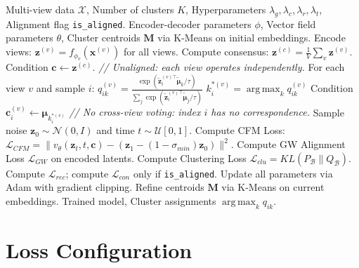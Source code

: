 \documentclass{article}
\DeclareMathOperator*{\argmax}{arg\,max}
\theoremstyle{plain}
\theoremstyle{definition}
\theoremstyle{remark}
\begin{document}
\begin{algorithm}[!htbp]
  \caption{End-to-End Training for OPTION}
  \label{alg:option}
  \begin{algorithmic}
     Multi-view data $\mathcal{X}$, Number of clusters $K$, Hyperparameters $\lambda_g, \lambda_c, \lambda_r, \lambda_t$, Alignment flag \texttt{is\_aligned}.
     Encoder-decoder parameters $\phi$, Vector field parameters $\theta$, Cluster centroids $\mathbf{M}$ via K-Means on initial embeddings.
        \STATE Encode views: $\mathbf{z}^{(v)} = f_{\phi_v}(\mathbf{x}^{(v)})$ for all views.
            \STATE Compute consensus: $\mathbf{z}^{(c)} = \frac{1}{V}\sum_v \mathbf{z}^{(v)}$.
            \STATE Condition $\mathbf{c} \gets \mathbf{z}^{(c)}$.
        \ELSE
            \STATE \textit{// Unaligned: each view operates independently.}
            \STATE For each view $v$ and sample $i$:
            \STATE \quad $q_{ik}^{(v)} = \frac{\exp(\tilde{\mathbf{z}}_i^{(v)\top} \tilde{\boldsymbol{\mu}}_k / \tau)}{\sum_j \exp(\tilde{\mathbf{z}}_i^{(v)\top} \tilde{\boldsymbol{\mu}}_j / \tau)}$
            \STATE \quad $k^{*(v)}_i = \argmax_k q_{ik}^{(v)}$
            \STATE \quad Condition $\mathbf{c}_i^{(v)} \gets \boldsymbol{\mu}_{k^{*(v)}_i}$
            \STATE \textit{// No cross-view voting: index $i$ has no correspondence.}
        \ENDIF
        \STATE Sample noise $\mathbf{z}_0 \sim \mathcal{N}(0, I)$ and time $t \sim \mathcal{U}[0,1]$.
        \STATE Compute CFM Loss: $\mathcal{L}_{CFM} = \| v_\theta(\mathbf{z}_t, t, \mathbf{c}) - (\mathbf{z}_1 - (1-\sigma_{min})\mathbf{z}_0) \|^2$.
        \STATE Compute GW Alignment Loss $\mathcal{L}_{GW}$ on encoded latents.
        \STATE Compute Clustering Loss $\mathcal{L}_{clu} = KL(P_{\mathcal{B}} \| Q_{\mathcal{B}})$.
        \STATE Compute $\mathcal{L}_{rec}$; compute $\mathcal{L}_{con}$ only if \texttt{is\_aligned}.
        \STATE Update all parameters via Adam with gradient clipping.
    \ENDFOR
        \STATE Refine centroids $\mathbf{M}$ via K-Means on current embeddings.
    \ENDIF
    \ENDFOR
     Trained model, Cluster assignments $\argmax_k q_{ik}$.
  \end{algorithmic}
\end{algorithm}


\section{Loss Configuration}
\label{app:loss_config}
\end{document}
